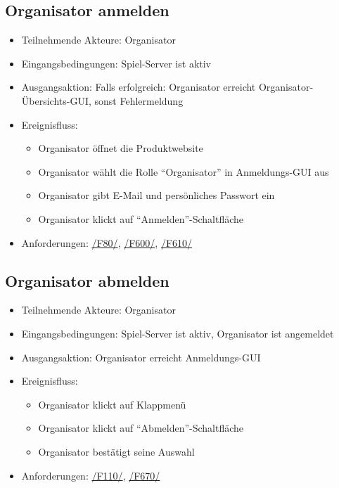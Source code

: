 \documentclass[a4paper]{scrreprt}
\begin{document}
    \subsection{Organisator anmelden}
    \begin{itemize}
        \item Teilnehmende Akteure: \Gls{Organisator}
        \item Eingangsbedingungen: \Gls{Spiel-Server} ist aktiv
        \item Ausgangsaktion: Falls erfolgreich: \Gls{Organisator} erreicht Organisator-Übersichts-GUI, sonst Fehlermeldung %
        \item Ereignisfluss:
        \begin{itemize}
            \item \Gls{Organisator} öffnet die Produktwebsite
            \item \Gls{Organisator} wählt die Rolle \enquote{\Gls{Organisator}} in Anmeldungs-GUI aus
            \item \Gls{Organisator} gibt E-Mail und persönliches Passwort ein
            \item \Gls{Organisator} klickt auf \enquote{Anmelden}-Schaltfläche
        \end{itemize}
        \item Anforderungen: \hyperlink{F80}{/F80/}, \hyperlink{F600}{/F600/},  \hyperlink{F610}{/F610/}
    \end{itemize}

    \subsection{Organisator abmelden}
    \begin{itemize}
        \item Teilnehmende Akteure: \Gls{Organisator}
        \item Eingangsbedingungen: \Gls{Spiel-Server} ist aktiv, \Gls{Organisator} ist angemeldet
        \item Ausgangsaktion: \Gls{Organisator} erreicht Anmeldungs-GUI
        \item Ereignisfluss:
        \begin{itemize}
            \item \Gls{Organisator} klickt auf Klappmenü
            \item \Gls{Organisator} klickt auf \enquote{Abmelden}-Schaltfläche
            \item \Gls{Organisator} bestätigt seine Auswahl
        \end{itemize}
        \item Anforderungen: \hyperlink{F110}{/F110/}, \hyperlink{F670}{/F670/}
    \end{itemize}
\end{document}
